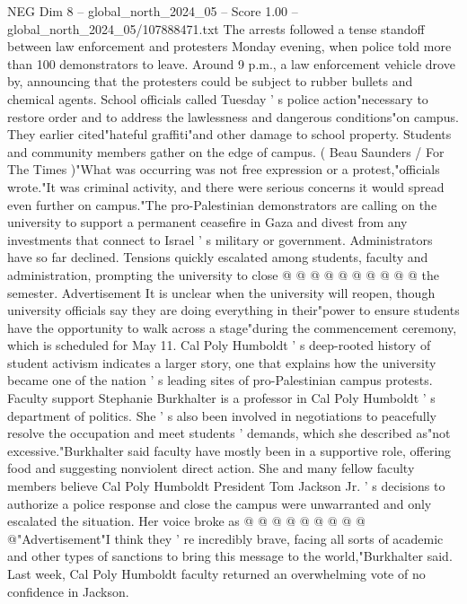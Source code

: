 \begin{textsample}{NEG Dim 8 – global\_north\_2024\_05 – Score 1.00 – global\_north\_2024\_05/107888471.txt}  \label{ex:f8_neg_387}
The arrests followed a tense standoff between law enforcement and protesters Monday evening, when police told more than 100 demonstrators to leave.
Around 9 p.m., a law enforcement vehicle drove by, announcing that the protesters could be subject to rubber bullets and chemical agents.
School officials called Tuesday ' s police action"necessary to restore order and to address the lawlessness and dangerous conditions"on campus.
They earlier cited"hateful graffiti"and other damage to school property.
Students and community members gather on the edge of campus. ( Beau Saunders / For The Times )"What was occurring was not free expression or a protest,"officials wrote."It was criminal activity, and there were serious concerns it would spread even further on campus."The pro-Palestinian demonstrators are calling on the university to support a permanent ceasefire in Gaza and divest from any investments that connect to Israel ' s military or government.
Administrators have so far declined.
Tensions quickly escalated among students, faculty and administration, prompting the university to close @ @ @ @ @ @ @ @ @ @ the semester.
Advertisement It is unclear when the university will reopen, though university officials say they are doing everything in their"power to ensure students have the opportunity to walk across a stage"during the commencement ceremony, which is scheduled for May 11.
Cal Poly Humboldt ' s deep-rooted history of student activism indicates a larger story, one that explains how the university became one of the nation ' s leading sites of pro-Palestinian campus protests.
Faculty support Stephanie Burkhalter is a professor in Cal Poly Humboldt ' s department of politics.
She ' s also been involved in negotiations to peacefully resolve the occupation and meet students ' demands, which she described as"not excessive."Burkhalter said faculty have mostly been in a supportive role, offering food and suggesting nonviolent direct action.
She and many fellow faculty members believe Cal Poly Humboldt President Tom Jackson Jr. ' s decisions to authorize a police response and close the campus were unwarranted and only escalated the situation.
Her voice broke as @ @ @ @ @ @ @ @ @ @"Advertisement"I think they ' re incredibly brave, facing all sorts of academic and other types of sanctions to bring this message to the world,"Burkhalter said.
Last week, Cal Poly Humboldt faculty returned an overwhelming vote of no confidence in Jackson.

\end{textsample}
